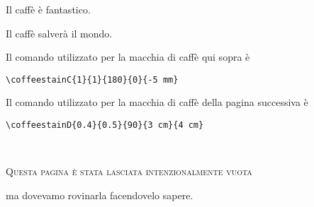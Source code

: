 \documentclass[a4paper, 11pt, BCOR = 0 pt, oneside]{scrartcl}
\begin{document}
Il caffè è fantastico.

\vspace{5mm}

\noindent
Il caffè salverà il mondo.

\vfill{}

\begin{tcolorbox}
Il comando utilizzato per la macchia di caffè qui sopra è

  \verb|\coffeestainC{1}{1}{180}{0}{-5 mm}|
\end{tcolorbox}

\begin{tcolorbox}
Il comando utilizzato per la macchia di caffè della pagina successiva è

  \verb|\coffeestainD{0.4}{0.5}{90}{3 cm}{4 cm}|
\end{tcolorbox}

\newpage{}
\pagestyle{empty}
~\\

\label{stainD}

\vfill{}
\begin{center}
\textsc{Questa pagina è stata lasciata intenzionalmente vuota}

ma dovevamo rovinarla facendovelo sapere.
\end{center}

\vfill{}
\end{document}
